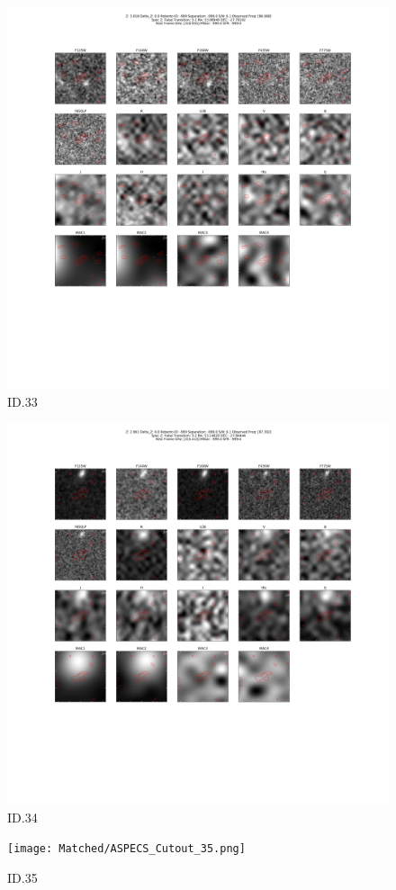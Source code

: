 \begin{figure}[tbp]
\centering \includegraphics[width=120mm]{Matched/ASPECS_Cutout_33.png}
\caption{ID.33}
\label{fig:Match_Three}
\end{figure}

\begin{figure}[tbp]
\centering \includegraphics[width=120mm]{Matched/ASPECS_Cutout_34.png}
\caption{ID.34}
\label{fig:Match_Three}
\end{figure}

\begin{figure}[tbp]
\centering \texttt{[image: Matched/ASPECS\_Cutout\_35.png]}
\caption{ID.35}
\label{fig:Match_Three}
\end{figure}


